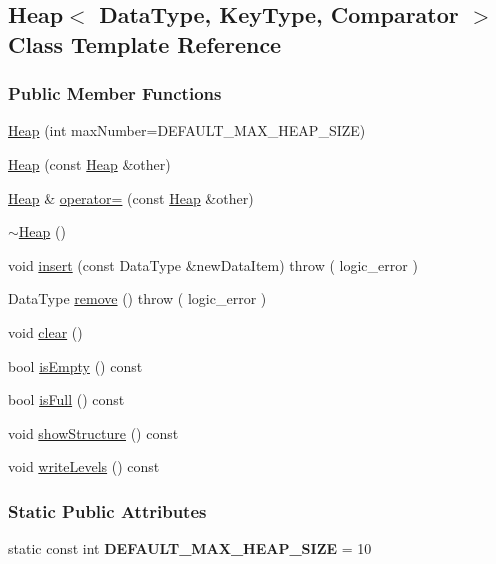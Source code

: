 \hypertarget{class_heap}{}\subsection{Heap$<$ Data\+Type, Key\+Type, Comparator $>$ Class Template Reference}
\label{class_heap}
\subsubsection*{Public Member Functions}
\begin{DoxyCompactItemize}
\item 
\hyperlink{class_heap_ae17e34e3c86d88263a8fdf80b9ba78fc}{Heap} (int max\+Number=D\+E\+F\+A\+U\+L\+T\+\_\+\+M\+A\+X\+\_\+\+H\+E\+A\+P\+\_\+\+S\+I\+ZE)
\item 
\hyperlink{class_heap_a97e3b462be1c6af31d7519546bba8907}{Heap} (const \hyperlink{class_heap}{Heap} \&other)
\item 
\hyperlink{class_heap}{Heap} \& \hyperlink{class_heap_a5ed119341c39bcea1437321d4247dd40}{operator=} (const \hyperlink{class_heap}{Heap} \&other)
\item 
\hyperlink{class_heap_a555ade7891007de959bef0ee53e28767}{$\sim$\+Heap} ()
\item 
void \hyperlink{class_heap_aa68cf80454ab1b246fa723612805a91e}{insert} (const Data\+Type \&new\+Data\+Item)  throw ( logic\+\_\+error )
\item 
Data\+Type \hyperlink{class_heap_a4a18bfdacd897c45fc3da13f22b8930d}{remove} ()  throw ( logic\+\_\+error )
\item 
void \hyperlink{class_heap_a19a78c8eae2cf7c8253e34e54d86ed73}{clear} ()
\item 
bool \hyperlink{class_heap_ab8fa26d416ac0e27dfcbf18c54f8f73f}{is\+Empty} () const 
\item 
bool \hyperlink{class_heap_ac9111b884c74a376240e0155a788756e}{is\+Full} () const 
\item 
void \hyperlink{class_heap_a3ae1e1f27a145749c8b9f2da777cb8bc}{show\+Structure} () const 
\item 
void \hyperlink{class_heap_a4bdb1772ea92899de245d6cbd217d085}{write\+Levels} () const 
\end{DoxyCompactItemize}
\subsubsection*{Static Public Attributes}
\begin{DoxyCompactItemize}
\item 
static const int {\bfseries D\+E\+F\+A\+U\+L\+T\+\_\+\+M\+A\+X\+\_\+\+H\+E\+A\+P\+\_\+\+S\+I\+ZE} = 10\hypertarget{class_heap_a967c19732a20a72e8e824402ad6763c8}{}\label{class_heap_a967c19732a20a72e8e824402ad6763c8}

\end{DoxyCompactItemize}
